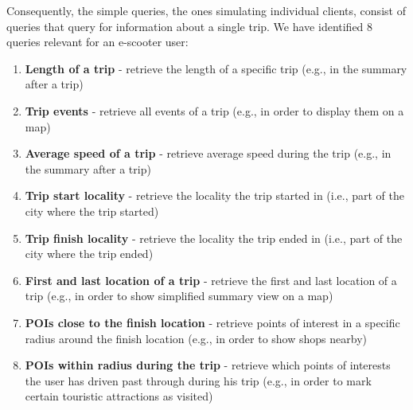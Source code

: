 Consequently, the simple queries, the ones simulating individual clients, consist of queries that query for information about a single trip.
We have identified 8 queries relevant for an e-scooter user:
\begin{enumerate}
  \item \textbf{Length of a trip} - retrieve the length of a specific trip (e.g., in the summary after a trip)
  \item \textbf{Trip events} - retrieve all events of a trip (e.g., in order to display them on a map)
  \item \textbf{Average speed of a trip} - retrieve average speed during the trip (e.g., in the summary after a trip)
  \item \textbf{Trip start locality} - retrieve the locality the trip started in (i.e., part of the city where the trip started)
  \item \textbf{Trip finish locality} - retrieve the locality the trip ended in (i.e., part of the city where the trip ended)
  \item \textbf{First and last location of a trip} - retrieve the first and last location of a trip (e.g., in order to show simplified summary view on a map)
  \item \textbf{POIs close to the finish location} - retrieve points of interest in a specific radius around the finish location (e.g., in order to show shops nearby)
  \item \textbf{POIs within radius during the trip} - retrieve which points of interests the user has driven past through during his trip (e.g., in order to mark certain touristic attractions as visited)
\end{enumerate}


